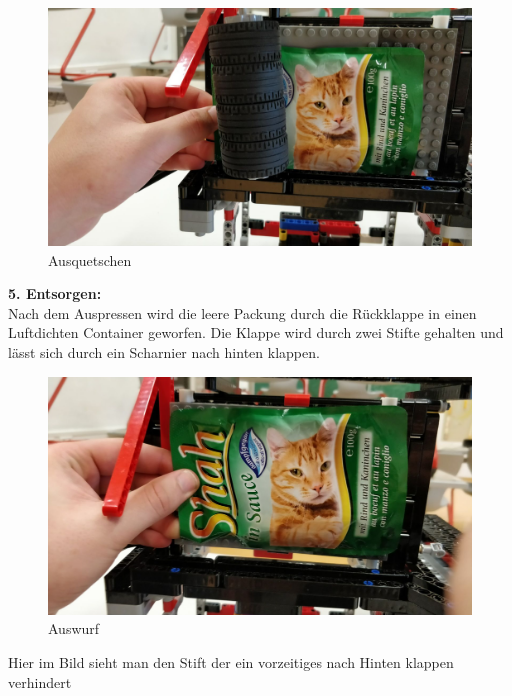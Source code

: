 \documentclass[a4paper,12pt]{scrartcl}
\begin{document}
\begin{figure}[H]
\begin{center}
\includegraphics[width=13cm]{Bilder/Ablauf_1_png/Ausquetschen_3}
\caption{Ausquetschen}
\end{center}
\end{figure}
\newpage
\textbf{5. Entsorgen:} \\

Nach dem Auspressen wird die leere Packung durch die Rückklappe in einen Luftdichten Container geworfen. Die Klappe wird durch zwei Stifte gehalten und lässt sich durch ein Scharnier nach hinten klappen. 

\begin{figure}[H]
\begin{center}
\includegraphics[width=13cm]{Bilder/Ablauf_1_png/Auswurf_1}
\caption{Auswurf}
\end{center}
\end{figure}

Hier im Bild sieht man den Stift der ein vorzeitiges nach Hinten klappen verhindert
\end{document}
